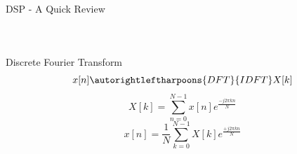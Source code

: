 \documentclass[10pt,xcolor=table]{beamer}
\begin{document}
	\begin{frame}{DSP - A Quick Review}
			\begin{columns}
				
				\begin{figure}
					\centering
					\scalebox{0.60}{}
				\end{figure}
				
				\begin{figure}
					\centering
					\scalebox{0.60}{}
				\end{figure}
			\end{columns}
		
		\begin{block}{Discrete Fourier Transform}
		    \[
		        x[n]\autorightleftharpoons{DFT}{IDFT}X[k]
		    \]
		$$X[k] = \sum_{n=0}^{N-1} x[n] e^{\frac{-j 2 \pi k n}{N}} $$
		$$x[n] = \frac{1}{N}\sum_{k=0}^{N-1} X[k] e^{\frac{+j 2 \pi k n}{N}} $$
		\end{block}
	\end{frame}
\end{document}
